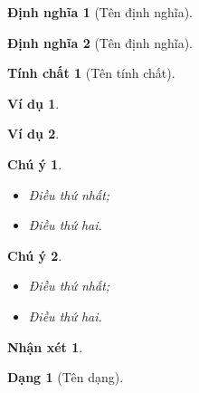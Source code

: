 \documentclass[12pt,a4paper,twoside]{article}
\theoremstyle{immini}
\newtheorem{dn}{Định nghĩa}
\newtheorem{tc}{Tính chất}
\newtheorem{vd}{Ví dụ}
\newtheorem{dang}{Dạng}
\newtheorem*{nx}{Nhận xét}
\newtheorem*{chuy}{Chú ý}
\begin{document}
	\begin{dn}[Tên định nghĩa]
		\lipsum[1]
	\end{dn}
	\begin{dn}[Tên định nghĩa]
		\lipsum[1]
	\end{dn}
	\begin{tc}[Tên tính chất]
		\lipsum[1]
	\end{tc}
	\begin{vd}
		\lipsum[1]
	\end{vd}
	\begin{vd}
		\lipsum[1]
	\end{vd}
	\begin{chuy}
		\begin{itemize}
			\item Điều thứ nhất;
			\item Điều thứ hai.
		\end{itemize}
	\end{chuy}
	\begin{chuy}
		\begin{itemize}
			\item Điều thứ nhất;
			\item Điều thứ hai.
		\end{itemize}
	\end{chuy}
	\begin{nx}
		\lipsum[1]
	\end{nx}
	\begin{dang}[Tên dạng]
		\lipsum[1]
	\end{dang}
	
\end{document}
